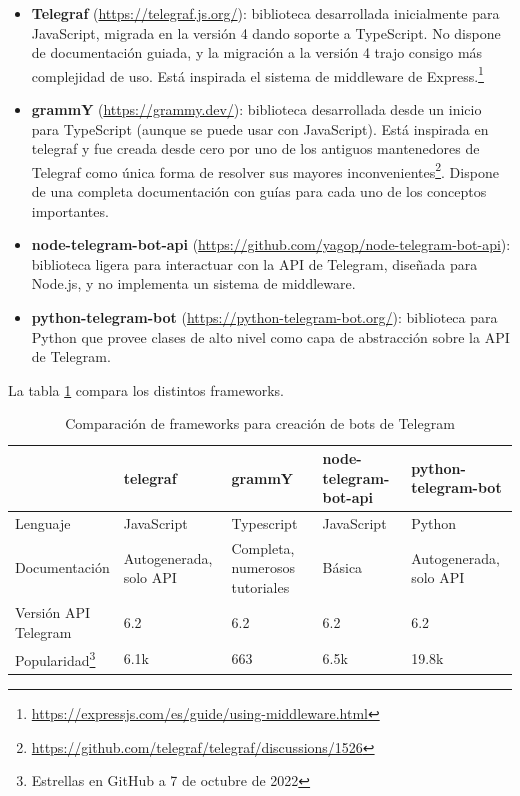 \begin{itemize}
    \item \textbf{Telegraf} (\url{https://telegraf.js.org/}): biblioteca desarrollada inicialmente para JavaScript, migrada en la versión 4 dando soporte a TypeScript. No dispone de documentación guiada, y la migración a la versión 4 trajo consigo más complejidad de uso. Está inspirada el sistema de middleware de Express.\footnote{\url{https://expressjs.com/es/guide/using-middleware.html}}
    \item \textbf{grammY} (\url{https://grammy.dev/}): biblioteca desarrollada desde un inicio para TypeScript (aunque se puede usar con JavaScript). Está inspirada en telegraf y fue creada desde cero por uno de los antiguos mantenedores de Telegraf como única forma de resolver sus mayores inconvenientes\footnote{\url{https://github.com/telegraf/telegraf/discussions/1526}}. Dispone de una completa documentación con guías para cada uno de los conceptos importantes.
    \item \textbf{node-telegram-bot-api} (\url{https://github.com/yagop/node-telegram-bot-api}): biblioteca ligera para interactuar con la API de Telegram, diseñada para Node.js, y no implementa un sistema de middleware.
    \item \textbf{python-telegram-bot} (\url{https://python-telegram-bot.org/}): biblioteca para Python que provee clases de alto nivel como capa de abstracción sobre la API de Telegram.
\end{itemize}

La tabla \ref{tab:comparacionFrameworks} compara los distintos frameworks.

\begin{table}
\begin{minipage}{\textwidth}
\begin{tabularx}{\textwidth}{|l|X|X|X|X|}
\hline
& telegraf & grammY & node-telegram-bot-api & python-telegram-bot \\
\hline
Lenguaje & JavaScript & Typescript & JavaScript & Python \\
\hline
Documentación & Autogenerada, solo API & Completa, numerosos tutoriales & Básica & Autogenerada, solo API \\
\hline
\makecell[l]{Versión API \\Telegram} & 6.2 & 6.2 & 6.2 & 6.2 \\
\hline
Popularidad\footnote{Estrellas en GitHub a 7 de octubre de 2022} & 6.1k & 663 & 6.5k & 19.8k \\
\hline
\end{tabularx}
\end{minipage}
\caption{Comparación de frameworks para creación de bots de Telegram}\label{tab:comparacionFrameworks}
\end{table}

